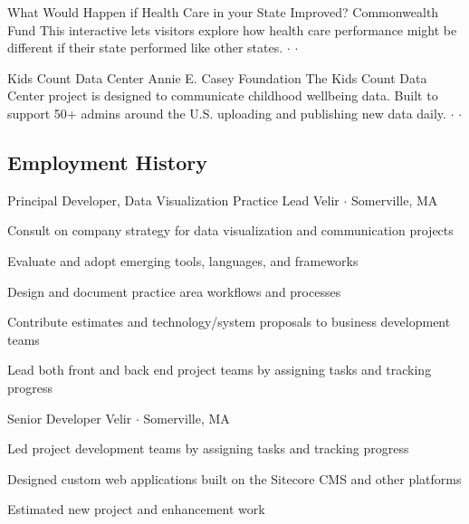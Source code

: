 \documentclass{article}
\begin{document}
\begin{paracol}{2}
\begin{leftcolumn}
{What Would Happen if Health Care in your State Improved?}
{Commonwealth Fund}{%
This interactive lets visitors explore how health care performance might be different if their state performed like other states.
 $\cdot$  $\cdot$ %
}

{Kids Count Data Center}
{Annie E. Casey Foundation}{%
The Kids Count Data Center project is designed to communicate childhood wellbeing data. Built to support 50+ admins around the U.S. uploading and publishing new data daily.
 $\cdot$  $\cdot$ %
}

\end{leftcolumn}
\begin{rightcolumn}
\section*{Employment History}

{Principal Developer, Data Visualization Practice Lead}
{Velir $\cdot$ Somerville, MA}{%
\begin{itemize*}
  \item Consult on company strategy for data visualization and communication projects
  \item Evaluate and adopt emerging tools, languages, and frameworks
  \item Design and document practice area workflows and processes
  \item Contribute estimates and technology/system proposals to business development teams
  \item Lead both front and back end project teams by assigning tasks and tracking progress
\end{itemize*}
}

{Senior Developer}
{Velir $\cdot$ Somerville, MA}{%
\begin{itemize*}
  \item Led project development teams by assigning tasks and tracking progress
  \item Designed custom web applications built on the Sitecore CMS and other platforms
  \item Estimated new project and enhancement work
\end{itemize*}
}


\end{rightcolumn}
\end{paracol}
\end{document}
